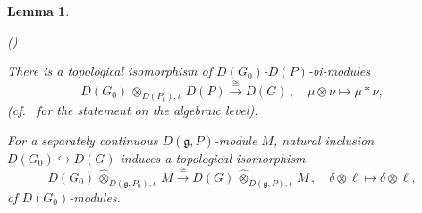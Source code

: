 \documentclass[a4paper, reqno, 10pt]{amsart}
\newtheorem{lemma}[theorem]{Lemma}
\theoremstyle{definition}
\newenvironment{altenumerate}
	{\begin{list}
		{\textup{(\theenumi)} }
		{\usecounter{enumi}
			\setlength{\labelwidth}{0pt}
			\setlength{\labelsep}{0pt}
			\setlength{\leftmargin}{0pt}
			\setlength{\itemsep}{0pt}
			\setlength{\topsep}{0pt}
		\renewcommand{\theenumi}{\roman{enumi}}
		}}
	{\end{list}}
\numberwithin{equation}{section}
\newcommand{\botimes}[1]{{\,\otimes_{#1}\,}}
\newcommand{\cotimes}[1]{{\,\widehat{\otimes}_{#1}\,}}
\newcommand{\lra}{\longrightarrow}
\newcommand{\lto}{\longmapsto}
\newcommand{\mto}{\mapsto}
\newcommand{\Fg}{{\mathfrak {g}}}
\begin{document}
\begin{lemma}\label{Lemma 3 - Tensor products over distribution algebras}
	\begin{altenumerate}
		\item
		There is a topological isomorphism of $D(G_0)$-$D(P)$-bi-modules
		\begin{equation*}
			D(G_0) \botimes{D(P_0),\iota} D(P) \overset{\cong}{\lra} D(G) \,,\quad \mu \otimes \nu \lto \mu \ast \nu ,
		\end{equation*}
		(cf.\ \cite[Lemma 6.1 (i)]{SchneiderTeitelbaum05DualAdmLocAnRep} for the statement on the algebraic level).
		\item
		For a separately continuous $D(\Fg,P)$-module $M$, natural inclusion $D(G_0) \hookrightarrow D(G)$ induces a topological isomorphism
		\begin{equation}\label{Eq 3 - Isomorphism of tensor products with distribution algebras}
			D(G_0) \cotimes{D(\Fg,P_0),\iota} M \overset{\cong}{\lra} D(G) \cotimes{D(\Fg,P),\iota} M \,,\quad \delta \otimes \ell \mto \delta \otimes \ell ,
		\end{equation}
		of $D(G_0)$-modules.
	\end{altenumerate}
\end{lemma}
\end{document}
